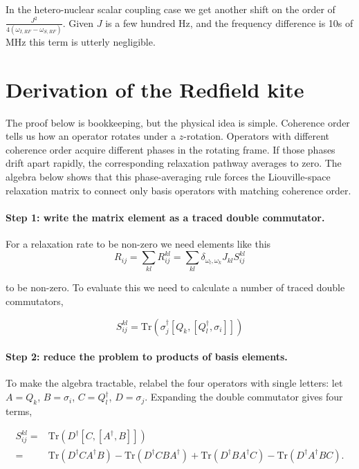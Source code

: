 \documentclass[notitlepage,11pt]{article}
\begin{document}
In the hetero-nuclear scalar coupling case we get another shift on the order of $\frac{J^2}{4(\omega_{I,RF}-\omega_{S,RF})}$. Given $J$ is a few hundred Hz, and the frequency difference is 10s of MHz this term is utterly negligible.



\section{Derivation of the Redfield kite}
\label{deriv:kite}
   The proof below is bookkeeping, but the physical idea is simple. Coherence order tells us how an operator rotates under a $z$-rotation. Operators with different coherence order acquire different phases in the rotating frame. If those phases drift apart rapidly, the corresponding relaxation pathway averages to zero. The algebra below shows that this phase-averaging rule forces the Liouville-space relaxation matrix to connect only basis operators with matching coherence order.

   \paragraph{Step 1: write the matrix element as a traced double commutator.}


   For a relaxation rate to be non-zero we need elements like this
   \begin{equation}
R_{ij}=\sum_{kl}R_{ij}^{kl}= \sum_{kl}  \delta_{\omega_l,\omega_k}   J_{kl}  S_{ij}^{kl}
   \end{equation}

   to be non-zero. To evaluate this we need to calculate a number of traced double commutators,

   \begin{equation}
S_{ij}^{kl}=  \mathrm{Tr}\left(\sigma_j^\dagger \left[Q_k,\left[Q_l^\dagger,\sigma_i\right]\right]\right)
\end{equation}

\paragraph{Step 2: reduce the problem to products of basis elements.}
To make the algebra tractable, relabel the four operators with single letters: let $A=Q_k$, $B=\sigma_i$, $C=Q_l^\dagger$, $D=\sigma_j$. Expanding the double commutator gives four terms,

   \begin{equation}
\begin{split}
  S_{ij}^{kl}=  &\mathrm{Tr}\left(D^\dagger \left[C,\left[A^\dagger,B\right]\right]\right) \\
  = & \mathrm{Tr}\left(D^\dagger CA^\dagger B \right) - \mathrm{Tr}\left(D^\dagger  CBA^\dagger  \right)+  \mathrm{Tr}\left(D^\dagger  BA^\dagger C \right) - \mathrm{Tr}\left(D^\dagger  A^\dagger BC \right).
\end{split}
\label{eq:ABCD}
\end{equation}
\end{document}
